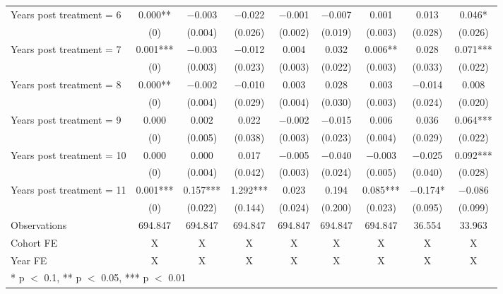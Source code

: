 \begin{table}[H]
{\begin{threeparttable}
\begin{tabular}[t]{lcccccccc}
Years post treatment = 6 & \num{0.000}** & \num{-0.003} & \num{-0.022} & \num{-0.001} & \num{-0.007} & \num{ 0.001} & \num{ 0.013} & \num{ 0.046}*\\
 & (\num{0}) & (\num{0.004}) & (\num{0.026}) & (\num{0.002}) & (\num{0.019}) & (\num{0.003}) & (\num{0.028}) & (\num{0.026})\\
Years post treatment = 7 & \num{0.001}*** & \num{-0.003} & \num{-0.012} & \num{ 0.004} & \num{ 0.032} & \num{ 0.006}** & \num{ 0.028} & \num{ 0.071}***\\
 & (\num{0}) & (\num{0.003}) & (\num{0.023}) & (\num{0.003}) & (\num{0.022}) & (\num{0.003}) & (\num{0.033}) & (\num{0.022})\\
Years post treatment = 8 & \num{0.000}** & \num{-0.002} & \num{-0.010} & \num{ 0.003} & \num{ 0.028} & \num{ 0.003} & \num{-0.014} & \num{ 0.008}\\
 & (\num{0}) & (\num{0.004}) & (\num{0.029}) & (\num{0.004}) & (\num{0.030}) & (\num{0.003}) & (\num{0.024}) & (\num{0.020})\\
Years post treatment = 9 & \num{0.000} & \num{ 0.002} & \num{ 0.022} & \num{-0.002} & \num{-0.015} & \num{ 0.006} & \num{ 0.036} & \num{ 0.064}***\\
 & (\num{0}) & (\num{0.005}) & (\num{0.038}) & (\num{0.003}) & (\num{0.023}) & (\num{0.004}) & (\num{0.029}) & (\num{0.022})\\
Years post treatment = 10 & \num{0.000} & \num{ 0.000} & \num{ 0.017} & \num{-0.005} & \num{-0.040} & \num{-0.003} & \num{-0.025} & \num{ 0.092}***\\
 & (\num{0}) & (\num{0.004}) & (\num{0.042}) & (\num{0.003}) & (\num{0.024}) & (\num{0.005}) & (\num{0.040}) & (\num{0.028})\\
Years post treatment = 11 & \num{0.001}*** & \num{ 0.157}*** & \num{ 1.292}*** & \num{ 0.023} & \num{ 0.194} & \num{ 0.085}*** & \num{-0.174}* & \num{-0.086}\\
 & (\num{0}) & (\num{0.022}) & (\num{0.144}) & (\num{0.024}) & (\num{0.200}) & (\num{0.023}) & (\num{0.095}) & (\num{0.099})\\
\midrule
Observations & \num{694,847} & \num{694,847} & \num{694,847} & \num{694,847} & \num{694,847} & \num{694,847} & \num{36,554} & \num{33,963}\\
Cohort FE & X & X & X & X & X & X & X & X\\
Year FE & X & X & X & X & X & X & X & X\\
\bottomrule
\multicolumn{9}{l}{\rule{0pt}{1em}* p $<$ 0.1, ** p $<$ 0.05, *** p $<$ 0.01}\\

\end{tabular}
\end{threeparttable}}
\end{table}
